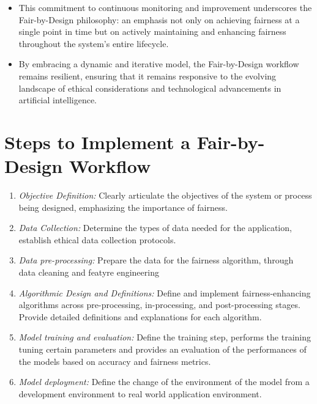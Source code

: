 \begin{enumerate}[label=\arabic*.]
\begin{itemize}
        \item This commitment to continuous monitoring and improvement underscores the Fair-by-Design philosophy: an emphasis not only on achieving fairness at a single point in time but on actively maintaining and enhancing fairness throughout the system's entire lifecycle.
      
        \item By embracing a dynamic and iterative model, the Fair-by-Design workflow remains resilient, ensuring that it remains responsive to the evolving landscape of ethical considerations and technological advancements in artificial intelligence.
   
    \end{itemize}

\end{enumerate}

\section{Steps to Implement a Fair-by-Design Workflow}
\label{section:steps}

\begin{enumerate}

    \item \emph{Objective Definition:} Clearly articulate the objectives of the system or process being designed, emphasizing the importance of fairness.

    \item \emph{Data Collection:} Determine the types of data needed for the application, establish ethical data collection protocols.

    \item \emph{Data pre-processing:} Prepare the data for the fairness algorithm, through data cleaning and featyre engineering
    
    \item \emph{Algorithmic Design and Definitions:} Define and implement fairness-enhancing algorithms across pre-processing, in-processing, and post-processing stages. Provide detailed definitions and explanations for each algorithm.

    \item \emph{Model training and evaluation:} Define the training step, performs the training tuning certain parameters and provides an evaluation of the performances of the models based on accuracy and fairness metrics.

    \item \emph{Model deployment:} Define the change of the environment of the model from a development environment to real world application environment.

\end{enumerate}

